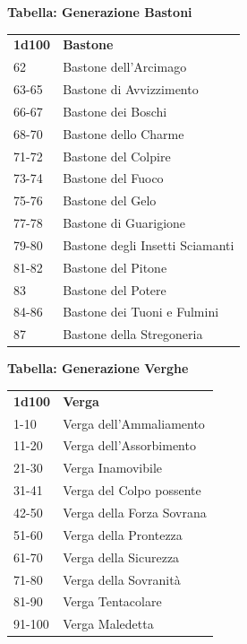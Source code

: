 \begin{multicols}{2}
\medskip

\textbf{Tabella: Generazione Bastoni}

\medskip

\begin{tabularx}{0.45\textwidth}{lX}
\textbf{1d100} & \textbf{Bastone}\\
62 &Bastone dell'Arcimago\\
63-65& Bastone di Avvizzimento\\
66-67& Bastone dei Boschi\\
68-70& Bastone dello Charme\\
71-72& Bastone del Colpire\\
73-74& Bastone del Fuoco\\
75-76& Bastone del Gelo\\
77-78& Bastone di Guarigione\\
79-80& Bastone degli Insetti Sciamanti\\
81-82& Bastone del Pitone\\
83 &Bastone del Potere\\
84-86& Bastone dei Tuoni e Fulmini\\
87 &Bastone della Stregoneria\\

\end{tabularx}

\medskip

\textbf{Tabella: Generazione Verghe}

\medskip

\begin{tabularx}{0.45\textwidth}{lX}
\textbf{1d100} & \textbf{Verga}\\
1-10&Verga dell'Ammaliamento\\
11-20&Verga dell'Assorbimento\\
21-30&Verga Inamovibile\\
31-41&Verga del Colpo possente\\
42-50&Verga della Forza Sovrana\\
51-60&Verga della Prontezza\\
61-70&Verga della Sicurezza\\
71-80&Verga della Sovranità\\
81-90& Verga Tentacolare\\
91-100& Verga Maledetta\\
\end{tabularx}


\end{multicols}
